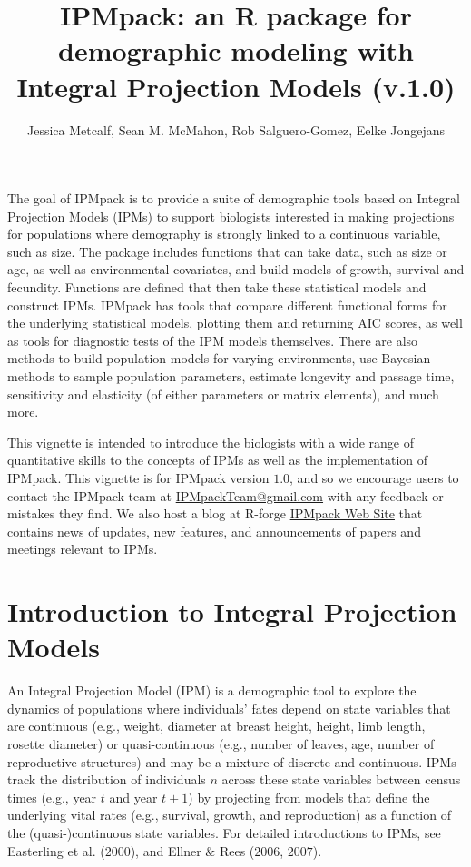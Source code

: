 \documentclass{article}
\begin{document}
\title{IPMpack: an R package for demographic modeling with Integral Projection Models (v.1.0)}
\author{Jessica Metcalf, Sean M. McMahon, Rob Salguero-Gomez, Eelke Jongejans}
\maketitle


The goal of IPMpack is to provide a suite of demographic tools based
on Integral Projection Models (IPMs) to support biologists interested in
making projections for populations where demography is strongly linked to a continuous variable, such as size. The package includes functions that can take data, such as size or age, as well as environmental covariates, and build models of growth, survival and fecundity. Functions are defined that then take these
statistical models and construct IPMs. IPMpack has tools that compare different functional forms for the underlying statistical models, plotting them and returning AIC scores, as well as tools for diagnostic tests of the IPM models themselves. There are also methods to build population models for varying environments, use Bayesian methods to sample population parameters,  estimate longevity and passage time, sensitivity and elasticity (of either parameters or matrix elements), and much more.

This vignette is intended to introduce the biologists with a wide range of quantitative skills to the concepts of IPMs as well as the implementation of IPMpack.  This vignette is for IPMpack version $1.0$, and so we encourage users to contact the IPMpack team at \href{IPMpackTeam@gmail.com}{IPMpackTeam@gmail.com} with any feedback or mistakes they find.  We also host a blog at R-forge \href{http://ipmpack.r-forge.r-project.org/}{IPMpack Web Site} that contains news of updates, new features, and announcements of papers and meetings relevant to IPMs. 
 
\newpage

\section{Introduction to Integral Projection Models}
An Integral Projection Model (IPM) is a demographic tool to explore the dynamics of populations where individuals' fates depend on state variables that are continuous (e.g., weight, diameter at breast height, height, limb length, rosette diameter) or quasi-continuous (e.g., number of leaves, age, number of reproductive structures) and may be a mixture of discrete and continuous. IPMs track the distribution of individuals $n$ across these state variables between census times (e.g., year $t$ and year $t+1$) by projecting from models that define the underlying vital rates (e.g., survival, growth, and reproduction) as a function of the (quasi-)continuous state variables. For detailed introductions to IPMs, see Easterling et al. ($2000$), and Ellner \& Rees ($2006$, $2007$). 
\end{document}
